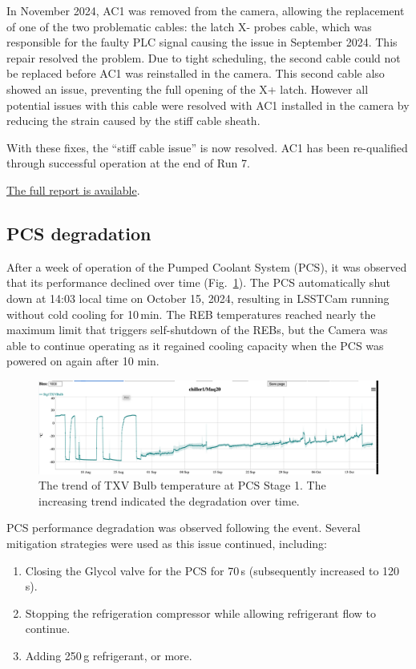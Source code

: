 In November 2024, AC1 was removed from the camera, allowing the replacement of one of the two problematic cables: the latch X- probes cable, which was responsible for the faulty PLC signal causing the issue in September 2024. This repair resolved the problem. Due to tight scheduling, the second cable could not be replaced before AC1 was reinstalled in the camera. This second cable also showed an issue, preventing the full opening of the X+ latch. However all potential  issues with this cable were resolved with AC1 installed in the camera by reducing the strain caused by the stiff cable sheath.

With these fixes, the ``stiff cable issue” is now resolved. AC1 has been re-qualified through successful operation at the end of Run 7.

\href{https://rubinobs.atlassian.net/browse/FRACAS-241}{The full report is available}.

\clearpage
\subsection{PCS degradation}\label{sec:pcsdegradation}
After a week of operation of the Pumped Coolant System (PCS), it was observed that its performance declined over time (Fig.~\ref{fig:pcsdegradation}). The PCS automatically shut down at 14:03 local time on October 15, 2024, resulting in LSSTCam running without cold cooling for 10\,min. The REB temperatures reached nearly the maximum limit that triggers self-shutdown of the REBs, but the Camera was able to continue operating as it regained cooling capacity when the PCS was powered on again after 10 min.

\begin{figure}[ht]
    \centering
    \includegraphics[width=1\linewidth]{figures//Issues/PCSTXVBulbAug11toOct17.png}
    \caption{The trend of TXV Bulb temperature at PCS Stage 1. The increasing trend indicated the degradation over time.}
    \label{fig:pcsdegradation}
\end{figure}

PCS performance degradation was observed following the event. Several mitigation strategies were used as this issue continued, including:
\begin{enumerate}


\item Closing the Glycol valve for the PCS for 70\,s (subsequently increased to 120\,s).
\item Stopping the refrigeration compressor while allowing refrigerant flow to continue.
\item Adding 250\,g refrigerant, or more.

\end{enumerate}

